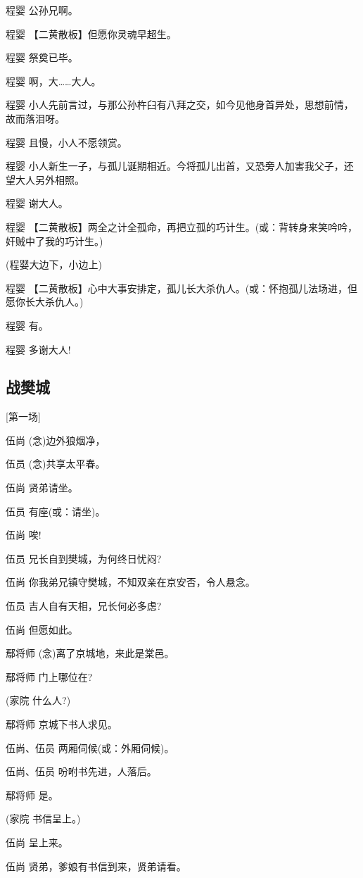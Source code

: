 程婴 公孙兄啊。

程婴 【二黄散板】但愿你灵魂早超生。

程婴 祭奠已毕。

程婴 啊，大\ldots{}\ldots{}大人。

程婴
小人先前言过，与那公孙杵臼有八拜之交，如今见他身首异处，思想前情，故而落泪呀。

程婴 且慢，小人不愿领赏。

程婴
小人新生一子，与孤儿诞期相近。今将孤儿出首，又恐旁人加害我父子，还望大人另外相照。

程婴 谢大人。

程婴
【二黄散板】两全之计全孤命，再把立孤的巧计生。(或：背转身来笑吟吟，奸贼中了我的巧计生。)

(程婴大边下，小边上)

程婴
【二黄散板】心中大事安排定，孤儿长大杀仇人。(或：怀抱孤儿法场进，但愿你长大杀仇人。)

程婴 有。

程婴 多谢大人!

\newpage
\hypertarget{ux6218ux6a0aux57ce}{%
\subsection{战樊城}\label{ux6218ux6a0aux57ce}}

{[}第一场{]}

伍尚 (念)边外狼烟净，

伍员 (念)共享太平春。

伍尚 贤弟请坐。

伍员 有座(或：请坐)。

伍尚 唉!

伍员 兄长自到樊城，为何终日忧闷?

伍尚 你我弟兄镇守樊城，不知双亲在京安否，令人悬念。

伍员 吉人自有天相，兄长何必多虑?

伍尚 但愿如此。

鄢将师 (念)离了京城地，来此是棠邑。

鄢将师 门上哪位在?

(家院 什么人?)

鄢将师 京城下书人求见。

伍尚、伍员 两厢伺候(或：外厢伺候)。

伍尚、伍员 吩咐书先进，人落后。

鄢将师 是。

(家院 书信呈上。)

伍尚 呈上来。

伍尚 贤弟，爹娘有书信到来，贤弟请看。

